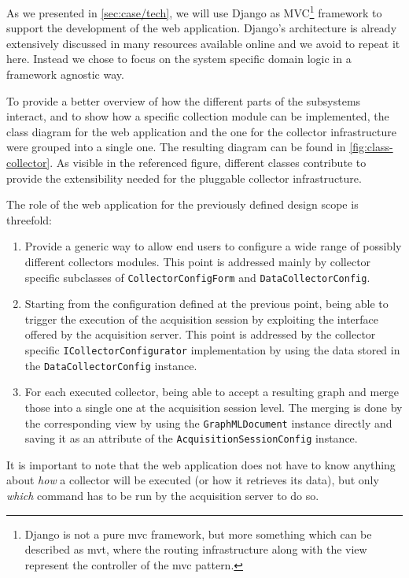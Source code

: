 As we presented in \vref{sec:case/tech}, we will use Django as MVC\footnote{Django is not a pure \gls{mvc} framework, but more something which can be described as \gls{mvt}, where the routing infrastructure along with the view represent the controller of the \gls{mvc} pattern.} framework to support the development of the web application. Django's architecture is already extensively discussed in many resources available online \cite{djangodoc} and we avoid to repeat it here. Instead we chose to focus on the system specific domain logic in a framework agnostic way.

To provide a better overview of how the different parts of the subsystems interact, and to show how a specific collection module can be implemented, the class diagram for the web application and the one for the collector infrastructure were grouped into a single one. The resulting diagram can be found in \vref{fig:class-collector}. As visible in the referenced figure, different classes contribute to provide the extensibility needed for the pluggable collector infrastructure.

The role of the web application for the previously defined design scope is threefold:
\begin{enumerate}
  \item Provide a generic way to allow end users to configure a wide range of possibly different collectors modules. This point is addressed mainly by collector specific subclasses of \texttt{CollectorConfigForm} and \texttt{DataCollectorConfig}.
  \item Starting from the configuration defined at the previous point, being able to trigger the execution of the acquisition session by exploiting the interface offered by the acquisition server. This point is addressed by the collector specific \texttt{ICollectorConfigurator} implementation by using the data stored in the \texttt{DataCollectorConfig} instance.
  \item For each executed collector, being able to accept a resulting graph and merge those into a single one at the acquisition session level. The merging is done by the corresponding view by using the \texttt{GraphMLDocument} instance directly and saving it as an attribute of the \texttt{AcquisitionSessionConfig} instance.
\end{enumerate}
It is important to note that the web application does not have to know anything about \emph{how} a collector will be executed (or how it retrieves its data), but only \emph{which} command has to be run by the acquisition server to do so.

